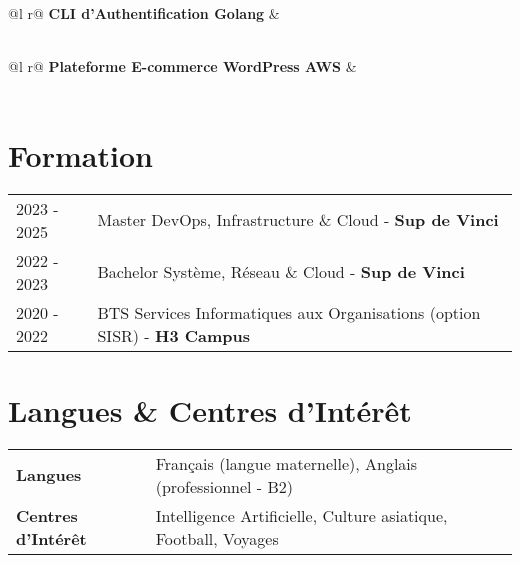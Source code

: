 \documentclass[a4paper,11pt]{article}
\begin{document}
\vspace{3pt}

\begin{tabularx}{\linewidth}{ @{}l r@{} }
\textbf{CLI d'Authentification Golang} & \hfill \\[1pt]
 \\
\end{tabularx}

\vspace{3pt}

\begin{tabularx}{\linewidth}{ @{}l r@{} }
\textbf{Plateforme E-commerce WordPress AWS} & \hfill \\[1pt]
 \\
\end{tabularx}

\vspace{6pt}

\section{Formation}
\begin{tabularx}{\linewidth}{@{}l X@{}} 
2023 - 2025 & Master DevOps, Infrastructure \& Cloud - \textbf{Sup de Vinci} \\
2022 - 2023 & Bachelor Système, Réseau \& Cloud - \textbf{Sup de Vinci} \\
2020 - 2022 & BTS Services Informatiques aux Organisations (option SISR) - \textbf{H3 Campus} \\
\end{tabularx}

\vspace{6pt}

\section{Langues \& Centres d'Intérêt}
\begin{tabularx}{\linewidth}{@{}l X@{}}
\textbf{Langues} & Français (langue maternelle), Anglais (professionnel - B2)\\
\textbf{Centres d'Intérêt} & Intelligence Artificielle, Culture asiatique, Football, Voyages\\
\end{tabularx}
\end{document}
